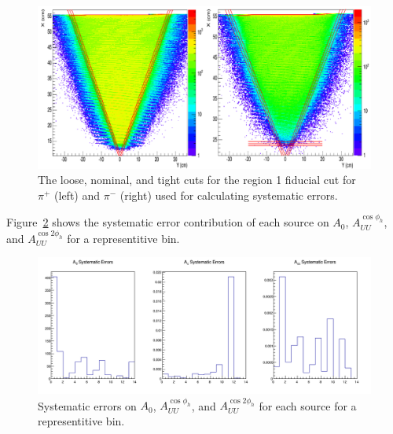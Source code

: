 %
\begin{figure}[htp]
\centering
\includegraphics[width=6in]{figures/pionSystematicCuts.png}
\caption{The loose, nominal, and tight cuts for the region 1 fiducial cut for $\pi^+$ (left) and $\pi^-$ (right) used for calculating systematic errors.}
\label{fig:pionSystematicCuts}
\end{figure}
%
Figure~\ref{fig:systematicErrors_representitiveBin} shows the systematic error contribution of each source on $A_0$, $A_{UU}^{\cos\phi_h}$, and $A_{UU}^{\cos 2\phi_h}$ for a representitive bin.
%
\begin{figure}[htp]
\centering
\includegraphics[width=6in]{figures/allSystematics_0_1_4_3.png}
\caption{Systematic errors on $A_0$, $A_{UU}^{\cos\phi_h}$, and $A_{UU}^{\cos 2\phi_h}$ for each source for a representitive bin.}
\label{fig:systematicErrors_representitiveBin}
\end{figure}
%

\clearpage
